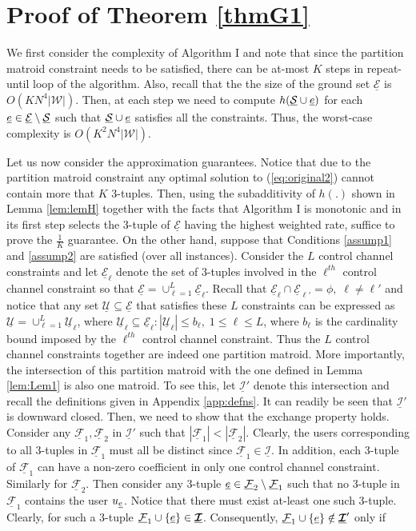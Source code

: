 \documentclass[11pt] {article}
\newcommand{\Wc} {{\mathcal W}}         \newcommand{\Wk} {{\bm {\mathcal W}}}
\newcommand{\Iulk} {{\underline{{\bm {\mathcal I}}}}}
\newcommand{\Uulc} {{\underline{\mathcal U}}}
\newcommand{\Eulc} {{\underline{\mathcal E}}}
\newcommand{\Fulc} {{\underline{\mathcal F}}}
\newcommand{\Sulc} {{\underline{\mathcal S}}}
\begin{document}
\section{Proof of Theorem \ref{thmG1}}\label{app:thmG1}
We first consider the complexity of Algorithm I  and note that since the partition matroid constraint needs to be satisfied, there can be at-most $K$ steps in repeat-until loop of the algorithm.
Also, recall that the  the size of the ground set $\Eulc$ is $O(KN^4|\Wc|)$. Then,  at each step we need to compute $h(\Sulc\cup\eul)$ for each $\eul\in\Eulc\setminus\Sulc$ such that $\Sulc\cup\eul$ satisfies all the constraints. Thus, the   worst-case complexity is $O(K^2N^4|\Wc|)$.




Let us now consider the approximation guarantees.
Notice that due to the partition matroid constraint any optimal solution to (\ref{eq:original2}) cannot contain more that $K$ 3-tuples. Then, using the subadditivity of $h(.)$ shown in Lemma \ref{lem:lemH} together with the facts that Algorithm I is monotonic and in its first step selects the 3-tuple of $\Eulc$  having the highest weighted rate, suffice to prove the $\frac{1}{K}$ guarantee. On the other hand, suppose that Conditions \ref{assump1} and \ref{assump2} are satisfied (over all instances). Consider the $L$ control channel constraints and  let  $\Eulc_{\ell}$ denote the set of 3-tuples involved in the $\ell^{th}$ control channel constraint so that $\Eulc=\cup_{\ell=1}^L\Eulc_{\ell}$. Recall that $\Eulc_{\ell}\cap \Eulc_{\ell'}=\phi,\;\ell\neq\ell'$ and notice that any set $\Uulc\subseteq\Eulc$ that satisfies these $L$ constraints can be expressed as $\Uulc=\cup_{\ell=1}^L\Uulc_{\ell}$, where $\Uulc_{\ell}\subseteq\Eulc_{\ell}: |\Uulc_{\ell}|\leq b_{\ell},\;1\leq\ell\leq L$, where $b_{\ell}$ is the cardinality bound imposed by the $\ell^{th}$ control channel constraint. Thus the $L$ control channel constraints together are indeed one partition matroid.
More importantly, the intersection of this partition matroid with the one defined in Lemma \ref{lem:Lem1} is also one matroid. To see this, let $\Iulk'$ denote this intersection and recall the definitions given in Appendix \ref{app:defns}. It can readily be seen that $\Iulk'$ is downward closed. Then, we need to show that the exchange property holds. Consider any
 $\Fulc_1,\Fulc_2$ in $\Iulk'$ such that $|\Fulc_1|< |\Fulc_2|$.  Clearly, the users corresponding to all 3-tuples in $\Fulc_1$ must all be distinct since $\Fulc_1\in\Iulk$. In addition, each 3-tuple of $\Fulc_1$ can   have a non-zero coefficient in only one control channel constraint. Similarly for $\Fulc_2$. Then consider any 3-tuple $\eul\in\Fulc_2\setminus\Fulc_1$ such that no 3-tuple in $\Fulc_1$ contains the user $u_{{\underline e}}$. Notice that there must exist at-least one such 3-tuple. Clearly, for such a 3-tuple $\Fulc_1\cup\{\eul\}\in\Iulk$. Consequently, $\Fulc_1\cup\{\eul\}\notin\Iulk'$ only if
\end{document}
